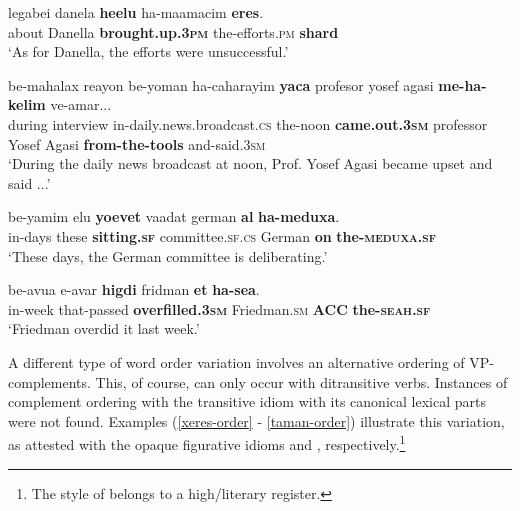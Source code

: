 \documentclass[output=paper]{langsci/langscibook}
\begin{document}
    \ea\label{xeres-v2}
        \gll legabei danela \textbf{he{\ayin}elu} ha-ma{\alef}amacim \textbf{{\het}eres}.\\
            about Danella \textbf{brought.up.\textsc{3pm}} the-efforts.\textsc{pm} \textbf{shard}\\
        \glt `As for Danella, the efforts were unsuccessful.'
    \z

    \ea\label{yaca-v2}
        \gll be-mahalax re{\alef}ayon be-yoman ha-caharayim \textbf{yaca} profesor yosef {\alef}agasi \textbf{me-ha-kelim} ve-amar...\\
            during interview in-daily.news.broadcast.\textsc{cs} the-noon \textbf{came.out.\textsc{3sm}} professor Yosef Agasi \textbf{from-the-tools} and-said.\textsc{3sm} \\
        \glt `During the daily news broadcast at noon, Prof. Yosef Agasi became upset and said ...'
    \z

    \ea\label{meduxa-v2}
        \gll be-yamim {\alef}elu \textbf{yo{\shin}evet} va{\ayin}adat german \textbf{{\ayin}al} \textbf{ha-meduxa}.\\
            in-days these \textbf{sitting.\textsc{sf}} committee.\textsc{sf}.\textsc{cs} German \textbf{on} \textbf{the-\textsc{meduxa}.\textsc{sf}}\\
        \glt `These days, the German committee is deliberating.'
    \z

    \ea\label{sea-v2}
        \gll be-{\shin}avu{\ayin}a {\shin}e-{\ayin}avar \textbf{higdi{\shin}} fridman \textbf{{\alef}et} \textbf{ha-se{\alef}a}.\\
            in-week that-passed \textbf{overfilled.\textsc{3sm}} Friedman.\textsc{sm} \textbf{ACC} \textbf{the-\textsc{seah}.\textsc{sf}}\\
        \glt `Friedman overdid it last week.'
    \z

A different type of word order variation involves an alternative ordering of VP-complements. This, of course, can only occur with ditransitive verbs. Instances of complement ordering with the transitive idiom  with its canonical lexical parts were not found. Examples (\ref{xeres-order} - \ref{taman-order}) illustrate this variation, as attested with the opaque figurative idioms  and , respectively.\footnote{The style of  belongs to a high/literary register.}
\end{document}
